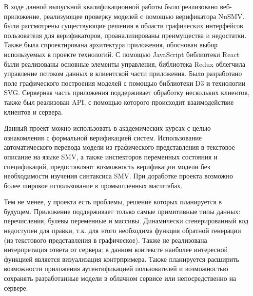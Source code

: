 \conclusion

В ходе данной выпускной квалификационной работы было реализовано веб-приложение, реализующее проверку моделей с помощью верификатора NuSMV. были рассмотрены существующие решения в области графических интерфейсов пользователя для верификаторов, проанализированы преимущества и недостатки. Также была спроектирована архитектура приложения, обоснован выбор используемых в проекте технологий. С помощью JavaScript библиотеки React были реализованы основные элементы управления, библиотека Redux облегчила управление потоком данных в клиентской части приложения. Было разработано поле графического построения моделей с помощью библиотеки D3 и технологии SVG. Серверная часть приложения поддерживает обработку нескольких клиентов, также был реализован API, с помощью которого происходит взаимодействие клиентов и сервера.

Данный проект можно использовать в академических курсах с целью ознакомления с формальной верификацией систем. Использование автоматического перевода модели из графического представления в текстовое описание на языке SMV, а также инспекторов переменных состояния и спецификаций, предоставляют возможность верификации модели без необходимости изучения синтаксиса SMV. При доработке проекта возможно более широкое использование в промышленных масштабах.

Тем не менее, у проекта есть проблемы, решение которых планируется в будущем. Приложение поддерживает только самые примитивные типы данных: перечисления, булевы переменные и массивы. Динамически сгенерированный код недоступен для правки, т.к. для этого необходима функция обратной генерации (из текстового представления в графическое). Также не реализована интерпретация ответа от сервера; в данном контексте наиболее интересной функцией является визуализация контрпримера. Также планируется расширить возможности приложения аутентификацией пользователей и возможностью сохранять разработанные модели в облачном сервисе или непосредственно на сервере.